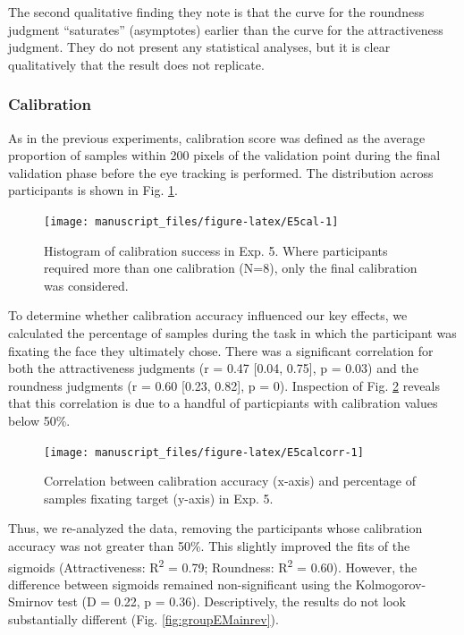 \documentclass[
  man,floatsintext]{apa6}
\begin{document}
The second qualitative finding they note is that the curve for the roundness judgment ``saturates'' (asymptotes) earlier than the curve for the attractiveness judgment. They do not present any statistical analyses, but it is clear qualitatively that the result does not replicate.

\subsubsection{Calibration}\label{calibration-5}

As in the previous experiments, calibration score was defined as the average proportion of samples within 200 pixels of the validation point during the final validation phase before the eye tracking is performed. The distribution across participants is shown in Fig. \ref{fig:E5cal}.


\begin{figure}
\texttt{[image: manuscript\_files/figure-latex/E5cal-1]} \caption{Histogram of calibration success in Exp. 5. Where participants required more than one calibration (N=8), only the final calibration was considered.}\label{fig:E5cal}
\end{figure}

To determine whether calibration accuracy influenced our key effects, we calculated the percentage of samples during the task in which the participant was fixating the face they ultimately chose. There was a significant correlation for both the attractiveness judgments (r = 0.47 {[}0.04, 0.75{]}, p = 0.03) and the roundness judgments (r = 0.60 {[}0.23, 0.82{]}, p = 0). Inspection of Fig. \ref{fig:E5calcorr} reveals that this correlation is due to a handful of particpiants with calibration values below 50\%.



\begin{figure}
\texttt{[image: manuscript\_files/figure-latex/E5calcorr-1]} \caption{Correlation between calibration accuracy (x-axis) and percentage of samples fixating target (y-axis) in Exp. 5.}\label{fig:E5calcorr}
\end{figure}

Thus, we re-analyzed the data, removing the participants whose calibration accuracy was not greater than 50\%. This slightly improved the fits of the sigmoids (Attractiveness: R\textsuperscript{2} = 0.79; Roundness: R\textsuperscript{2} = 0.60). However, the difference between sigmoids remained non-significant using the Kolmogorov-Smirnov test (D = 0.22, p = 0.36). Descriptively, the results do not look substantially different (Fig. \ref{fig:groupEMainrev}).
\end{document}
